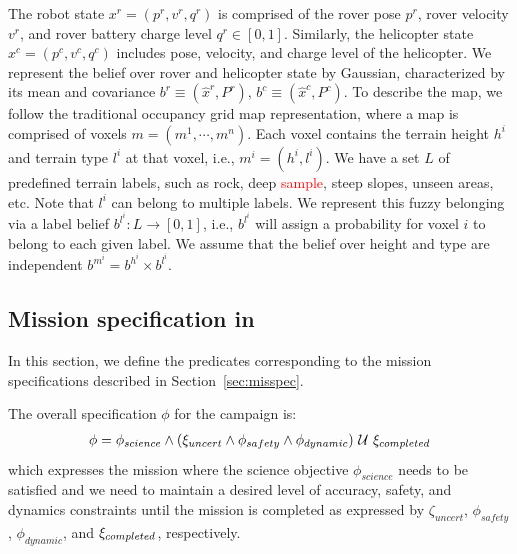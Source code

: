 \documentclass[conference]{IEEEtran}
\begin{document}
    The robot state $x^r=(p^r, v^r, q^r)$ is comprised of the rover pose $p^r$, rover velocity $v^r$, and rover battery charge level $q^r \in [0, 1]$. Similarly, the helicopter state $x^c=(p^c, v^c, q^c)$ includes pose, velocity, and charge level of the helicopter. We represent the belief over rover and helicopter state by Gaussian, characterized by its mean and covariance $b^r\equiv(\hat{x}^r,P^r)$, $b^c\equiv(\hat{x}^c,P^c)$. 
    To describe the map, we follow the traditional occupancy grid map representation, where a map is comprised of voxels $m=(m^1,\cdots,m^n)$. Each voxel contains the terrain height $h^i$ and terrain type $l^i$ at that voxel, i.e., $m^i = (h^i,l^i)$. We have a set $L$ of predefined terrain labels, such as rock, deep \textcolor{red}{sample}, steep slopes, unseen areas, etc. Note that $l^i$ can belong to multiple labels. We represent this fuzzy belonging via a label belief $b^{l^i}:L\rightarrow[0,1]$, i.e., $b^{l^i}$ will assign a probability for voxel $i$ to belong to each given label. We assume that the belief over height and type are independent $b^{m^i} = b^{h^i}\times b^{l^i}$. 
    
    
    \subsection{Mission specification in \DTL}
    \label{sec:gdtlspec}
    In this section, we define the \DTL predicates corresponding to the mission specifications described in Section~\ref{sec:misspec}.
    
    The overall specification $\phi$ for the campaign is:
    {\small
    \begin{align}
    \label{eq:overallspec}
        \phi = \phi_{science} \land (\pred_{uncert} \land \phi_{safety} \land \phi_{dynamic}) \Until \pred_{completed}
    \end{align}
    }%
    which expresses the mission where the science objective $\phi_{science}$ needs to be satisfied and we need to maintain a desired level of accuracy,
    safety, and dynamics constraints until the mission is completed as expressed by $\zeta_{uncert}$, $\phi_{safety}$, $\phi_{dynamic}$, and
    $\xi_{completed}$, respectively.
\end{document}
